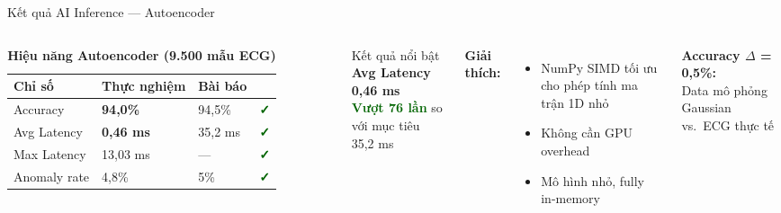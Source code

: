 \documentclass[aspectratio=169, 12pt]{beamer}
\newcommand{\cmark}{\textcolor{darkgreen}{\textbf{✓}}}
\begin{document}
\begin{frame}{Kết quả AI Inference — Autoencoder}

\begin{columns}[T]
\begin{table}
\caption*{\textbf{Hiệu năng Autoencoder (9.500 mẫu ECG)}}
\renewcommand{\arraystretch}{1.3}
\begin{tabular}{llll}
\toprule
\textbf{Chỉ số} & \textbf{Thực nghiệm} & \textbf{Bài báo} & \\
\midrule
Accuracy         & \textbf{94,0\%}   & 94,5\%  & \cmark \\
Avg Latency      & \textbf{0,46 ms}  & 35,2 ms & \cmark \\
Max Latency      & 13,03 ms          & —       & \cmark \\
Anomaly rate     & 4,8\%             & 5\%     & \cmark \\
\bottomrule
\end{tabular}
\end{table}

\begin{exampleblock}{Kết quả nổi bật}
\textbf{Avg Latency 0,46 ms}\\
\textcolor{darkgreen}{\textbf{Vượt 76 lần}} so với mục tiêu 35,2 ms
\end{exampleblock}

\vspace{0.3cm}
\textbf{Giải thích:}
\begin{itemize}
  \item NumPy SIMD tối ưu cho phép tính ma trận 1D nhỏ
  \item Không cần GPU overhead
  \item Mô hình nhỏ, fully in-memory
\end{itemize}

\vspace{0.2cm}
\textbf{Accuracy $\Delta$ = 0,5\%:}\\
Data mô phỏng Gaussian vs.\ ECG thực tế
\end{columns}

\end{frame}
\end{document}
